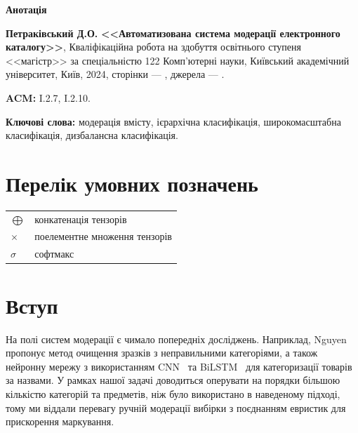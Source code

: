 \documentclass[fleqn,12pt,a4paper]{report}
\theoremstyle{plain}
\theoremstyle{definition}
\numberwithin{equation}{chapter}
\numberwithin{figure}{chapter}
\numberwithin{table}{chapter}
\numberwithin{footnote}{chapter}
\numberwithin{figure}{chapter}
\numberwithin{theorem}{chapter}
\numberwithin{definition}{chapter}
\begin{document}
    \begin{center}
        \Large \textbf{Анотація}
    \end{center}
    \noindent
    \textbf{Петраківський Д.О.} \textbf{<<Автоматизована система модерації електронного каталогу>>}, Кваліфікаційна
    робота на здобуття освітнього ступеня <<магістр>> за спеціальністю 122 Комп'ютерні науки, Київський академічний
    університет, Київ, 2024, сторінки --- \ztotpages, джерела --- .

    \bigskip
    \noindent
    \textbf{ACM:} I.2.7, I.2.10.

    \bigskip
    \noindent
    \textbf{Ключові слова:} модерація вмісту, ієрархічна класифікація, широкомасштабна класифікація, дизбалансна
    класифікація.

    \newpage
    \tableofcontents

    \newpage

    \chapter*{Перелік умовних позначень}\label{ch:conventions}

    \bigskip
    \begin{tabular}{ll}
        $\bigoplus$ & конкатенація тензорів         \\
        $\times$    & поелементне множення тензорів \\
        $\sigma$    & софтмакс
    \end{tabular}

    \newpage

    \listoffigures

    \newpage

    \chapter*{Вступ}\label{ch:introduction}

    На полі систем модерації є чимало попередніх досліджень.
    Наприклад, Nguyen~\cite{Nguyen2022} пропонує метод очищення зразків з неправильними категоріями, а також нейронну
    мережу з використанням CNN~\cite{Lecun1998} та BiLSTM~\cite{Schuster1997} для категоризації товарів за назвами.
    У рамках нашої задачі доводиться оперувати на порядки більшою кількістю категорій та предметів, ніж було
    використано в наведеному підході, тому ми віддали перевагу ручній модерації вибірки з поєднанням евристик для
    прискорення маркування.
\end{document}
